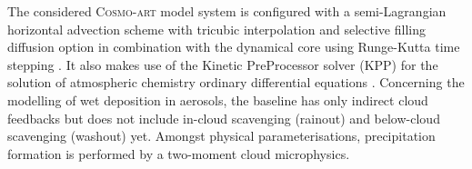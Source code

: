 The considered  \textsc{Cosmo-art} model  system is configured  with a
semi-Lagrangian    horizontal   advection    sche\-me    with   tricubic
interpolation  and selective filling  diffusion option  in combination
with   the   dynamical    core   using   Runge-Kutta   time   stepping
\citep{COSMO-PartI-2011}.    It  also   makes  use   of   the  Kinetic
PreProcessor solver (KPP) for  the solution of atmospheric chemistry
ordinary  differential equations \citep{Damian-2002}.   Concerning the
modelling  of  wet  deposition  in  aerosols, the  baseline  has  only
indirect  cloud feedbacks  but  does not  include in-cloud  scavenging
(rainout) and below-cloud  scavenging (washout) yet.  Amongst physical
parameterisations,   precipitation  formation   is   performed  by   a
two-moment cloud microphysics.
